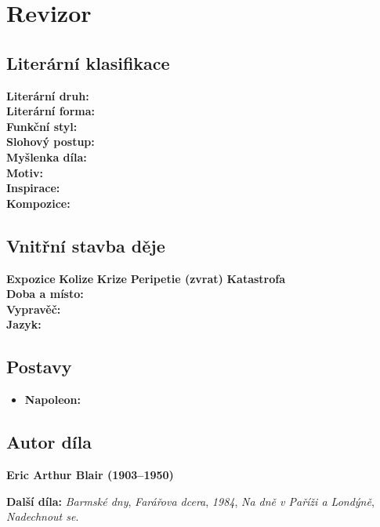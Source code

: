 \documentclass[12pt, a4paper]{article}
\newcommand{\mybf}[1]{\textcolor[RGB]{0, 179, 219}{\textbf{#1}}}
\begin{document}
\newpage


\section{Revizor}

\subsection*{Literární klasifikace}
\mybf{Literární druh:} \\[3pt]
\mybf{Literární forma:} \\[3pt]
\mybf{Funkční styl:} \\[3pt]
\mybf{Slohový postup:} \\[10pt]
\mybf{Myšlenka díla:} \\[10pt]
\mybf{Motiv:} \\[10pt]
\mybf{Inspirace:} \\[10pt]
\mybf{Kompozice:} 

\subsection*{Vnitřní stavba děje}
\noindent\textbf{Expozice} 
\noindent\textbf{Kolize} 
\noindent\textbf{Krize} 
\noindent\textbf{Peripetie (zvrat)} 
\noindent\textbf{Katastrofa} \\[10pt]
\mybf{Doba a místo:} \\[10pt]
\mybf{Vypravěč:} \\[10pt]
\mybf{Jazyk:} 

\subsection*{Postavy}
\begin{itemize}[itemsep=0.3em]
	\item \textbf{Napoleon:}
\end{itemize}

\subsection*{Autor díla}
\textbf{Eric Arthur Blair (1903--1950)}

\textbf{Další díla:} \textit{Barmské dny}, \textit{Farářova dcera}, \textit{1984}, \textit{Na dně v Paříži a Londýně}, \textit{Nadechnout se}.
\end{document}
